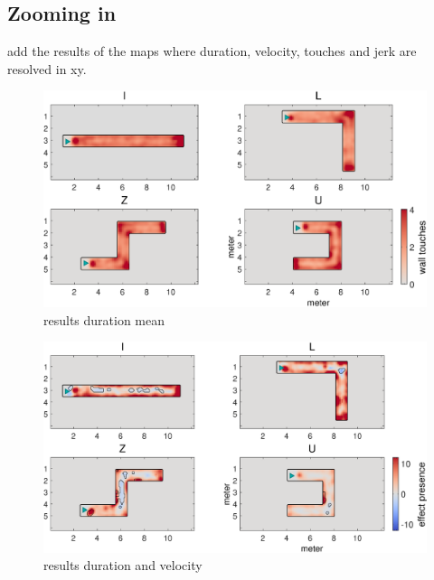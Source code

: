 \subsection{Zooming in} add the results of the maps where duration, velocity, touches and jerk are resolved in xy.

\begin{figure}[h]
\centering
\includegraphics[width=\linewidth]{figures/duration_mean.eps}
\vspace{0pt}
\caption{results duration mean}
\label{results_dur_mean}
\end{figure}

\begin{figure}[h]
\centering
\includegraphics[width=\linewidth]{figures/effect_presence_duration.eps}
\vspace{0pt}
\caption{results duration and velocity}
\label{results_dur_effect}
\end{figure}

